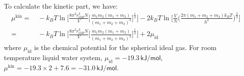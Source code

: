 \documentclass[aip,jcp,a4paper,reprint,onecolumn]{revtex4-1}
\newcommand{\kin}{\textrm{kin}}
\begin{document}
\noindent
To calculate the kinetic part, we have:
\begin{align}
  \mu^\kin =&\,
  -k_BT \ln
  \bigg[
  \frac{8\pi^2 r_{OH}^3 N}{V}
  \Big[\frac{m_1 m_2 (m_1+m_2)}{ (m_1 + m_2 + m_3)^3}\Big]^{\frac12}
  \bigg]
  -2k_BT \ln
  \bigg[
  \frac{V}{N}
  \Big(
  \frac{2\pi (m_1+m_2+m_3)k_BT}{h^2}
  \Big)^{\frac{3}{2}}
  \bigg] \\
  =&\,
  -k_BT \ln
  \bigg[
  \frac{8\pi^2 r_{OH}^3 N}{V}
  \Big[\frac{m_1 m_2 (m_1+m_2)}{ (m_1 + m_2 + m_3)^3}\Big]^{\frac12}
  \bigg]
  + 2 \mu_{\textrm{id}}
\end{align}
where $\mu_{\textrm{id}}$ is the chemical potential for the spherical
ideal gas.
For room temperature liquid water system,
$\mu_{\textrm{id}} = -19.3\,\textsf{kJ/mol}$,
$\mu^\kin = -19.3\times 2 + 7.6 = -31.0\,\textsf{kJ/mol}$.
\end{document}
